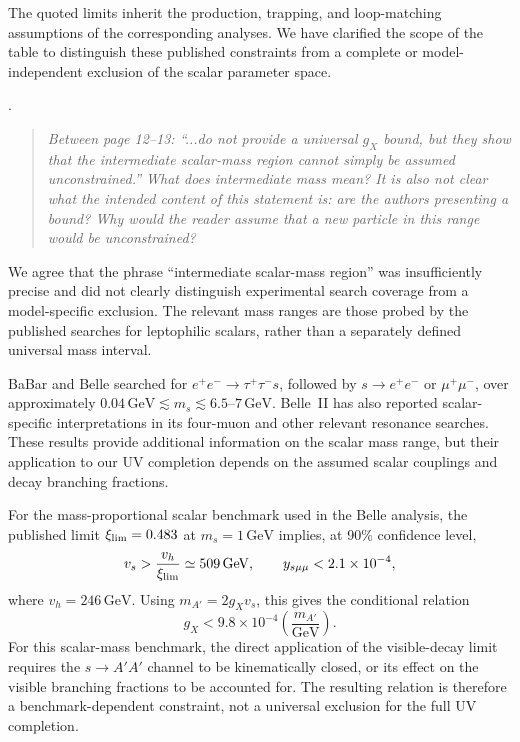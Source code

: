 \documentclass[12pt,a4paper]{article}
\begin{document}
The quoted limits inherit the production, trapping, and loop-matching assumptions of the corresponding analyses. We have clarified the scope of the table to distinguish these published constraints from a complete or model-independent exclusion of the scalar parameter space.

\medskip
{}. \begin{quote}\itshape
Between page 12--13: ``...do not provide a universal \(g_X\) bound, but they show that the intermediate scalar-mass region cannot simply be assumed unconstrained.'' What does intermediate mass mean? It is also not clear what the intended content of this statement is: are the authors presenting a bound? Why would the reader assume that a new particle in this range would be unconstrained?
\end{quote}

We agree that the phrase ``intermediate scalar-mass region'' was insufficiently precise and did not clearly distinguish experimental search coverage from a model-specific exclusion. The relevant mass ranges are those probed by the published searches for leptophilic scalars, rather than a separately defined universal mass interval.

BaBar and Belle searched for
\(e^+e^-\to\tau^+\tau^-s\), followed by
\(s\to e^+e^-\) or \(\mu^+\mu^-\), over approximately
\(0.04\,\mathrm{GeV}\lesssim m_s\lesssim6.5\)--\(7\,\mathrm{GeV}\).
Belle~II has also reported scalar-specific interpretations in its four-muon and other relevant resonance searches. These results provide additional information on the scalar mass range, but their application to our UV completion depends on the assumed scalar couplings and decay branching fractions.

For the mass-proportional scalar benchmark used in the Belle analysis, the published limit \(\xi_{\rm lim}=0.483\) at \(m_s=1\,\mathrm{GeV}\) implies, at 90\% confidence level,
\[
v_s>\frac{v_h}{\xi_{\rm lim}}
\simeq509\,\mathrm{GeV},
\qquad
y_{s\mu\mu}<2.1\times10^{-4},
\]
where \(v_h=246\,\mathrm{GeV}\). Using \(m_{A'}=2g_Xv_s\), this gives the conditional relation
\[
g_X<9.8\times10^{-4}
\left(\frac{m_{A'}}{\mathrm{GeV}}\right).
\]
For this scalar-mass benchmark, the direct application of the visible-decay limit requires the \(s\to A'A'\) channel to be kinematically closed, or its effect on the visible branching fractions to be accounted for. The resulting relation is therefore a benchmark-dependent constraint, not a universal exclusion for the full UV completion.
\end{document}
